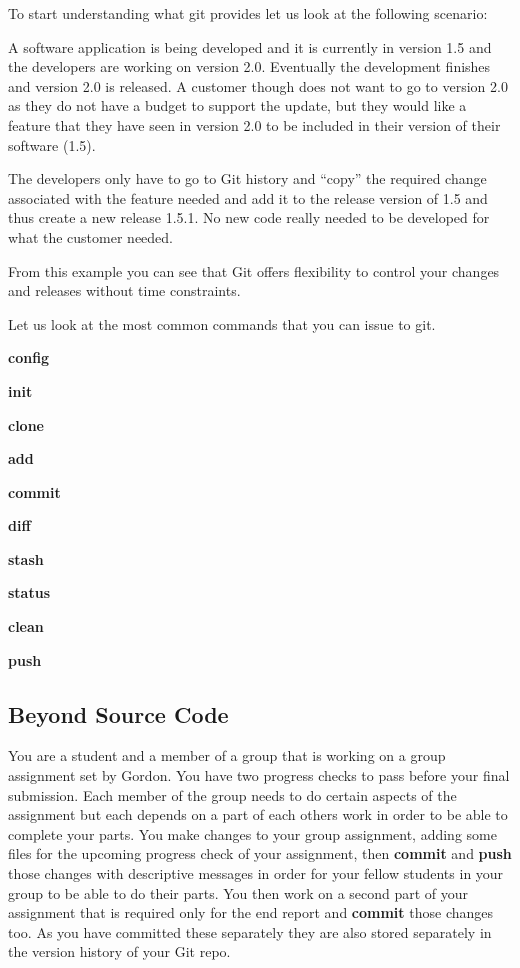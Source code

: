 \documentclass[
]{book}
\begin{document}
To start understanding what git provides let us look at the following scenario:

A software application is being developed and it is currently in version 1.5 and the developers are working on version 2.0.
Eventually the development finishes and version 2.0 is released. A customer though does not want to go to version 2.0 as they do not have a budget to support the update, but they would like a feature that they have seen in version 2.0 to be included in their version of their software (1.5).

The developers only have to go to Git history and ``copy'' the required change associated with the feature needed and add it to the release version of 1.5 and thus create a new release 1.5.1.
No new code really needed to be developed for what the customer needed.

From this example you can see that Git offers flexibility to control your changes and releases without time constraints.

Let us look at the most common commands that you can issue to git.

\textbf{config}

\textbf{init}

\textbf{clone}

\textbf{add}

\textbf{commit}

\textbf{diff}

\textbf{stash}

\textbf{status}

\textbf{clean}

\textbf{push}

\hypertarget{beyond-source-code}{%
\subsection{Beyond Source Code}\label{beyond-source-code}}

You are a student and a member of a group that is working on a group assignment set by Gordon. You have two progress checks to pass before your final submission.
Each member of the group needs to do certain aspects of the assignment but each depends on a part of each others work in order to be able to complete your parts.
You make changes to your group assignment, adding some files for the upcoming progress check of your assignment, then \textbf{commit} and \textbf{push} those changes with descriptive messages in order for your fellow students in your group to be able to do their parts. You then work on a second part of your assignment that is required only for the end report and \textbf{commit} those changes too. As you have committed these separately they are also stored separately in the version history of your Git repo.
\end{document}
